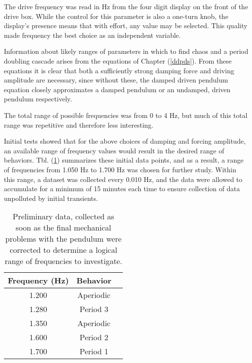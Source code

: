 \documentclass[12pt,twoside]{reedthesis}
\begin{document}
The drive frequency was read in Hz from the four digit display on the front of the drive box.  While the control for this parameter is also a one-turn knob, the display's presence means that with effort, any value may be selected.  This quality made frequency the best choice as an independent variable.  


Information about likely ranges of parameters in which to find chaos and a period doubling cascade arises from the equations of Chapter  (\ref{ddpds}).  From these equations it is clear that both a sufficiently strong damping force and driving amplitude are necessary, since without these, the damped driven pendulum equation closely approximates a damped pendulum or an undamped, driven pendulum respectively.  

The total range of possible frequencies was from 0 to 4 Hz, but much of this total range was repetitive and therefore less interesting.  

Initial tests showed that for the above choices of damping and forcing amplitude, an available range of frequency values would result in the desired range of behaviors.  Tbl. (\ref{freq_pretests}) summarizes these initial data points, and as a result, a range of frequencies from 1.050 Hz to 1.700 Hz was chosen for further study.  Within this range, a dataset was collected every 0.010 Hz, and the data were allowed to accumulate for a minimum of 15 minutes each time to ensure collection of data unpolluted by initial transients.  



\begin{table}[h]
	\caption{Preliminary data, collected as soon as the final mechanical problems with the pendulum were corrected to determine a logical range of frequencies to investigate.}
	\begin{center}
		\begin{tabular}{c c c} 
			\toprule
			Frequency (Hz) & Behavior \\
			\midrule
			1.200 & Aperiodic \\
			1.280 & Period 3 \\
			1.350 & Aperiodic \\
			1.600 & Period 2 \\
			1.700 & Period 1 \\
			\bottomrule
		\end{tabular}
	\end{center}
	\label{freq_pretests}
\end{table}
\end{document}
